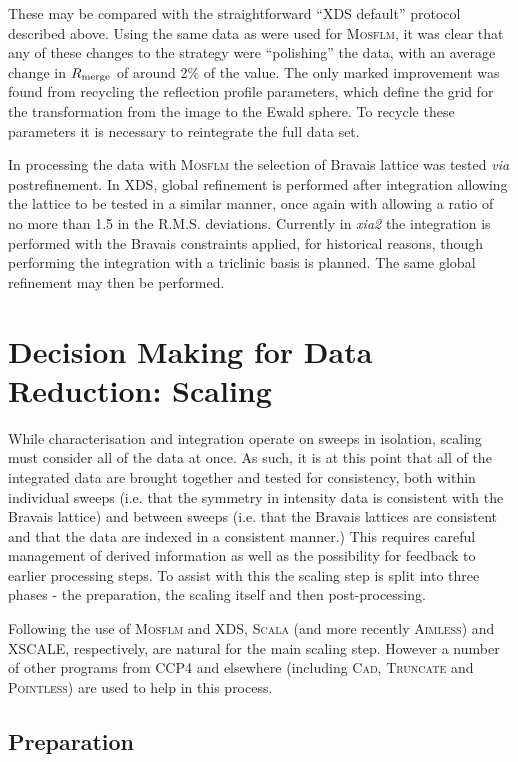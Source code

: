 \documentclass[preprint,pdf]{iucr}
\begin{document}
\noindent
These may be compared with the straightforward ``XDS default''
protocol described above. Using
the same data as were used for \textsc{Mosflm}, it was
clear that any of these changes to the strategy were ``polishing'' the
data, with an average change in $R_{\rm{merge}}$ of around 2\% of the
value. The only marked improvement was found from recycling the
reflection profile parameters, which define the grid for the
transformation from the image to the Ewald sphere.
To recycle these parameters it is necessary to reintegrate the full data set.

In processing the data with \textsc{Mosflm} the selection of Bravais lattice
was tested \emph{via} postrefinement. In XDS, global refinement is
performed after integration allowing the lattice to be tested in a
similar manner, once again with allowing a ratio of no more than 1.5
in the R.M.S. deviations. Currently in
\emph{xia2} the integration is performed with the Bravais constraints
applied, for historical reasons, though performing the integration
with a triclinic basis is planned. The same global refinement may then
be performed.

\section{Decision Making for Data Reduction: Scaling}

While characterisation and integration operate on sweeps in isolation,
scaling must consider all of the data at once. As such, it is at this
point that all of the integrated data are brought together and tested
for consistency, both within individual sweeps (i.e. that the symmetry
in intensity data is consistent with the Bravais lattice) and between
sweeps (i.e. that the Bravais lattices are consistent and that the
data are indexed in a consistent manner.) This requires careful
management of derived information as well as the possibility for feedback to
earlier processing steps. To assist with this the scaling step is
split into three phases - the preparation, the scaling itself and then
post-processing.

Following the use of \textsc{Mosflm} and XDS, \textsc{Scala} 
(and more recently \textsc{Aimless}) and
XSCALE, respectively, 
are natural for the main scaling step. However a number of other
programs from CCP4 and elsewhere (including \textsc{Cad}, 
\textsc{Truncate} and
\textsc{Pointless}) are used to help in this process.

\subsection{Preparation}
\end{document}
